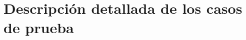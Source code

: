 \graphicspath{{anexos/AnexoD-Tabla-Casos/recursos/}}

\section{Descripción detallada de los casos de prueba} \label{Anexo:tabla-casos}
%

%
%
%
%
%
%
%
%
%		
%	
%	
%	
%	
